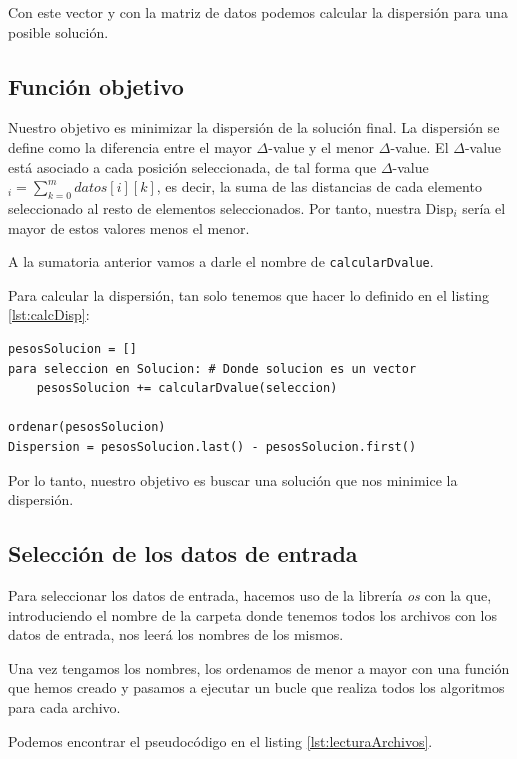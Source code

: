Con este vector y con la matriz de datos podemos calcular la dispersión para una posible solución.


\subsection{Función objetivo}

Nuestro objetivo es minimizar la dispersión de la solución final.
La dispersión se define como la diferencia entre el mayor $\Delta$-value y el menor $\Delta$-value.
El $\Delta$-value está asociado a cada posición seleccionada, de tal forma que $\Delta$-value$_{i} = \sum_{k=0}^{m}datos[i][k]$, es decir, la suma de las distancias de cada elemento seleccionado al resto de elementos seleccionados. Por tanto, nuestra Disp$_i$ sería el mayor de estos valores menos el menor.

A la sumatoria anterior vamos a darle el nombre de \texttt{calcularDvalue}.

Para calcular la dispersión, tan solo tenemos que hacer lo definido en el listing \ref{lst:calcDisp}:

\begin{lstlisting}[frame=single, caption={Cálculo de la dispersión para una posible solución}, captionpos=b, label=lst:calcDisp]
pesosSolucion = []
para seleccion en Solucion: # Donde solucion es un vector
    pesosSolucion += calcularDvalue(seleccion)

ordenar(pesosSolucion)
Dispersion = pesosSolucion.last() - pesosSolucion.first()
\end{lstlisting}

Por lo tanto, nuestro objetivo es buscar una solución que nos minimice la dispersión.



\subsection{Selección de los datos de entrada}

Para seleccionar los datos de entrada, hacemos uso de la librería \textit{os} con la que, introduciendo el nombre de la carpeta donde tenemos todos los archivos con los datos de entrada, nos leerá los nombres de los mismos.

Una vez tengamos los nombres, los ordenamos de menor a mayor con una función que hemos creado y pasamos a ejecutar un bucle que realiza todos los algoritmos para cada archivo.

Podemos encontrar el pseudocódigo en el listing \ref{lst:lecturaArchivos}.

